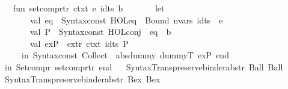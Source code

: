 \begin{isabellebody}
\isanewline
\ \ \ \ fun\ setcompr{\isacharunderscore}{\kern0pt}tr\ ctxt\ {\isacharbrackleft}{\kern0pt}e{\isacharcomma}{\kern0pt}\ idts{\isacharcomma}{\kern0pt}\ b{\isacharbrackright}{\kern0pt}\ {\isacharequal}{\kern0pt}\isanewline
\ \ \ \ \ \ let\isanewline
\ \ \ \ \ \ \ \ val\ eq\ {\isacharequal}{\kern0pt}\ Syntax{\isachardot}{\kern0pt}const\ \isactrlconstUNDERSCOREsyntax {\isasymopen}HOL{\isachardot}{\kern0pt}eq{\isasymclose}\ {\isachardollar}{\kern0pt}\ Bound\ {\isacharparenleft}{\kern0pt}nvars\ idts{\isacharparenright}{\kern0pt}\ {\isachardollar}{\kern0pt}\ e{\isacharsemicolon}{\kern0pt}\isanewline
\ \ \ \ \ \ \ \ val\ P\ {\isacharequal}{\kern0pt}\ Syntax{\isachardot}{\kern0pt}const\ \isactrlconstUNDERSCOREsyntax {\isasymopen}HOL{\isachardot}{\kern0pt}conj{\isasymclose}\ {\isachardollar}{\kern0pt}\ eq\ {\isachardollar}{\kern0pt}\ b{\isacharsemicolon}{\kern0pt}\isanewline
\ \ \ \ \ \ \ \ val\ exP\ {\isacharequal}{\kern0pt}\ ex{\isacharunderscore}{\kern0pt}tr\ ctxt\ {\isacharbrackleft}{\kern0pt}idts{\isacharcomma}{\kern0pt}\ P{\isacharbrackright}{\kern0pt}{\isacharsemicolon}{\kern0pt}\isanewline
\ \ \ \ \ \ in\ Syntax{\isachardot}{\kern0pt}const\ \isactrlconstUNDERSCOREsyntax {\isasymopen}Collect{\isasymclose}\ {\isachardollar}{\kern0pt}\ absdummy\ dummyT\ exP\ end{\isacharsemicolon}{\kern0pt}\isanewline
\isanewline
\ \ in\ {\isacharbrackleft}{\kern0pt}{\isacharparenleft}{\kern0pt}\isactrlsyntaxUNDERSCOREconst {\isasymopen}{\isacharunderscore}{\kern0pt}Setcompr{\isasymclose}{\isacharcomma}{\kern0pt}\ setcompr{\isacharunderscore}{\kern0pt}tr{\isacharparenright}{\kern0pt}{\isacharbrackright}{\kern0pt}\ end\isanewline
{\isacartoucheclose}\isanewline
\isanewline
{}\isamarkupfalse%
\ {\isacartoucheopen}\isanewline
\ {\isacharbrackleft}{\kern0pt}Syntax{\isacharunderscore}{\kern0pt}Trans{\isachardot}{\kern0pt}preserve{\isacharunderscore}{\kern0pt}binder{\isacharunderscore}{\kern0pt}abs{}{\isacharunderscore}{\kern0pt}tr{\isacharprime}{\kern0pt}\ \isactrlconstUNDERSCOREsyntax {\isasymopen}Ball{\isasymclose}\ \isactrlsyntaxUNDERSCOREconst {\isasymopen}{\isacharunderscore}{\kern0pt}Ball{\isasymclose}{\isacharcomma}{\kern0pt}\isanewline
\ \ Syntax{\isacharunderscore}{\kern0pt}Trans{\isachardot}{\kern0pt}preserve{\isacharunderscore}{\kern0pt}binder{\isacharunderscore}{\kern0pt}abs{}{\isacharunderscore}{\kern0pt}tr{\isacharprime}{\kern0pt}\ \isactrlconstUNDERSCOREsyntax {\isasymopen}Bex{\isasymclose}\ \isactrlsyntaxUNDERSCOREconst {\isasymopen}{\isacharunderscore}{\kern0pt}Bex{\isasymclose}{\isacharbrackright}{\kern0pt}\isanewline

\end{isabellebody}
